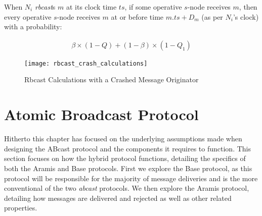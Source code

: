 When $N_i$ \emph{rbcast}s $m$ at its clock time $ts$, if some operative $s$-node receives $m$, then every operative $s$-node receives $m$ at or before time $m.ts+D_m$ (as per $N_i$'s clock) with a probability:

         \begin{equation*}
            \begin{aligned}
                \beta\times(1-Q)+(1-\beta)\times(1-Q_1)
            \end{aligned}
        \end{equation*}

        \begin{sidewaysfigure}
            \vspace*{-1cm}
            \strictpagecheck
            \checkoddpage
            \ifoddpage
                \hspace*{-2.5cm}
            \fi           
            \centering
                \texttt{[image: rbcast\_crash\_calculations]}
            \caption[Rbcast Calculation Diagram with a Crashed Message Originator]{Rbcast Calculations with a Crashed Message Originator}
            \label{fig:rbcast_crash_calc}
       \end{sidewaysfigure}

                
\clearpage
\section{Atomic Broadcast Protocol}\label{sec:ABcast}
Hitherto this chapter has focused on the underlying assumptions made when designing the \textsf{ABcast} protocol and the components it requires to function.  This section focuses on how the hybrid protocol functions, detailing the specifics of both the \textsf{Aramis} and \textsf{Base} protocols.  First we explore the \textsf{Base} protocol, as this protocol will be responsible for the majority of message deliveries and is the more conventional of the two \emph{abcast} protocols.  We then explore the \textsf{Aramis} protocol, detailing how messages are delivered and rejected as well as other related properties.  

